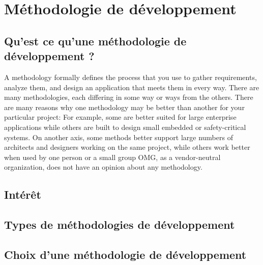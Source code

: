 \chapter{Méthodologie de développement}

\section{Qu'est ce qu'une méthodologie de développement ?}
A methodology formally defines the process that you use to gather requirements, analyze them, and design an application that meets them in every way. There are many methodologies, each differing in some way or ways from the others. There are many reasons why one methodology may be better than another for your particular project: For example, some are better suited for large enterprise applications while others are built to design small embedded or safety-critical systems. On another axis, some methods better support large numbers of architects and designers working on the same project, while others work better when used by one person or a small group
OMG, as a vendor-neutral organization, does not have an opinion about any methodology.

\section{Intérêt}

\section{Types de méthodologies de développement}

\section{Choix d'une méthodologie de développement}

\clearpage 